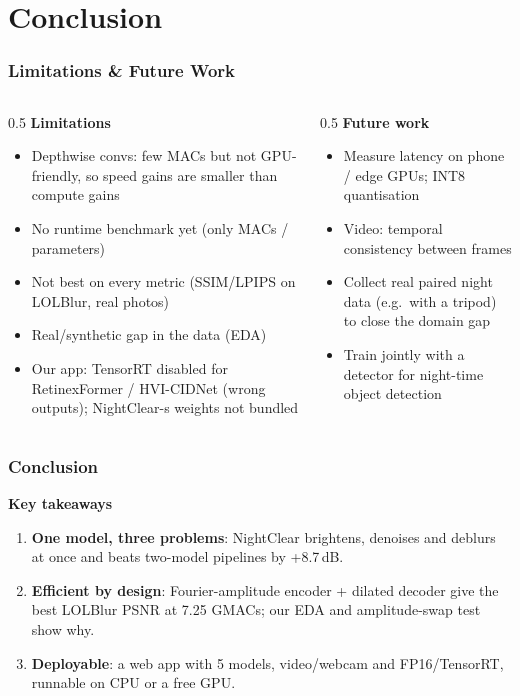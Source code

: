 \section{Conclusion}

\begin{frame}
    \frametitle{Limitations \& Future Work}
    \begin{columns}[t]
        \begin{column}{0.5\textwidth}
            \footnotesize
            \textbf{Limitations}
            \begin{itemize}
                \item Depthwise convs: few MACs but not GPU-friendly, so speed gains are smaller than compute gains
                \item No runtime benchmark yet (only MACs / parameters)
                \item Not best on every metric (SSIM/LPIPS on LOLBlur, real photos)
                \item Real/synthetic gap in the data (EDA)
                \item Our app: TensorRT disabled for RetinexFormer / HVI-CIDNet (wrong outputs); NightClear-s weights not bundled
            \end{itemize}
        \end{column}
        \begin{column}{0.5\textwidth}
            \footnotesize
            \textbf{Future work}
            \begin{itemize}
                \item Measure latency on phone / edge GPUs; INT8 quantisation
                \item Video: temporal consistency between frames
                \item Collect real paired night data (e.g.\ with a tripod) to close the domain gap
                \item Train jointly with a detector for night-time object detection
            \end{itemize}
        \end{column}
    \end{columns}
\end{frame}

\begin{frame}
    \frametitle{Conclusion}
    \textbf{Key takeaways}
    \begin{enumerate}
        \item \textbf{One model, three problems}: NightClear brightens, denoises and deblurs at once and beats two-model pipelines by +8.7\,dB.
        \item \textbf{Efficient by design}: Fourier-amplitude encoder + dilated decoder give the best LOLBlur PSNR at 7.25 GMACs; our EDA and amplitude-swap test show why.
        \item \textbf{Deployable}: a web app with 5 models, video/webcam and FP16/TensorRT, runnable on CPU or a free GPU.
    \end{enumerate}
\end{frame}
